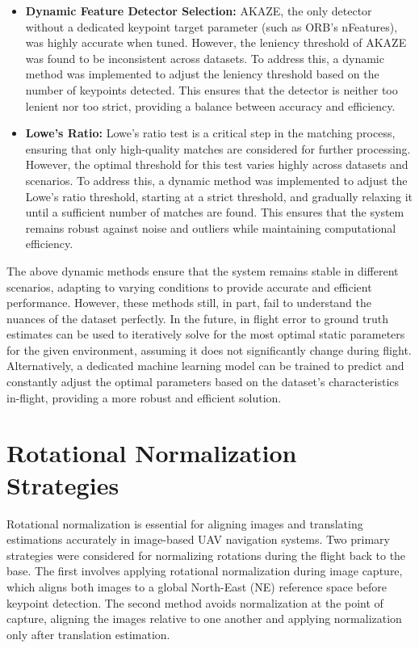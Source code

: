 \begin{enumerate}
\begin{itemize}
    \item \textbf{Dynamic Feature Detector Selection:} AKAZE, the only detector without a dedicated keypoint target parameter (such as ORB's nFeatures), was highly accurate when tuned. However, the leniency threshold of AKAZE was found to be inconsistent across datasets. To address this, a dynamic method was implemented to adjust the leniency threshold based on the number of keypoints detected. This ensures that the detector is neither too lenient nor too strict, providing a balance between accuracy and efficiency.
    \item \textbf{Lowe's Ratio:} Lowe's ratio test is a critical step in the matching process, ensuring that only high-quality matches are considered for further processing. However, the optimal threshold for this test varies highly across datasets and scenarios. To address this, a dynamic method was implemented to adjust the Lowe's ratio threshold, starting at a strict threshold, and gradually relaxing it until a sufficient number of matches are found. This ensures that the system remains robust against noise and outliers while maintaining computational efficiency.
\end{itemize}

The above dynamic methods ensure that the system remains stable in different scenarios, adapting to varying conditions to provide accurate and efficient performance. However, these methods still, in part, fail to understand the nuances of the dataset perfectly. In the future, in flight error to ground truth estimates can be used to iteratively solve for the most optimal static parameters for the given environment, assuming it does not significantly change during flight. Alternatively, a dedicated machine learning model can be trained to predict and constantly adjust the optimal parameters based on the dataset's characteristics in-flight, providing a more robust and efficient solution.


\section*{Rotational Normalization Strategies}

Rotational normalization is essential for aligning images and translating estimations accurately in image-based UAV navigation systems. Two primary strategies were considered for normalizing rotations during the flight back to the base. The first involves applying rotational normalization during image capture, which aligns both images to a global North-East (NE) reference space before keypoint detection. The second method avoids normalization at the point of capture, aligning the images relative to one another and applying normalization only after translation estimation.


\end{enumerate}
